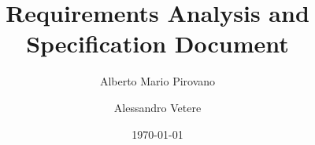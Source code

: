 \documentclass{article}      %
\title{Requirements Analysis and Specification Document}    %
\author{Alberto Mario Pirovano \and Alessandro Vetere}      %
\date{\today}	%
\newcommand{\myTaxiService}[0]{\mbox{\emph{myTaxiService}}}
\newcommand{\sectionBaseDir}[1]{./section_#1}
\newcommand{\sectionTexPath}[1]{\sectionBaseDir{#1}/section_#1.tex}
\newcommand{\inputSection}[1]{\newpage}}
\begin{document}
\maketitle
\newpage %
\tableofcontents             %
\inputSection{1}
\inputSection{2}
\inputSection{3}
\inputSection{4}
\end{document}
